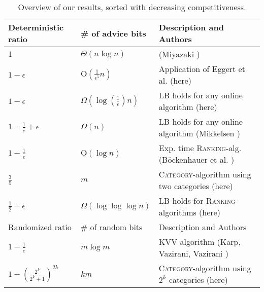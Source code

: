 \documentclass[a4paper]{article}
\newcommand{\Order}{\mathrm{O}}
\begin{document}
\begin{table}[ht]
\small
\begin{center}
 \begin{tabularx}{\textwidth}{|llX|}
\hline
Deterministic ratio & \# of advice bits & Description and Authors    \\
\hline
$1$ & $\Theta(n \log n)$ & (Miyazaki \cite{m14}) \\
$1-\epsilon$ & $\Order(\frac{1}{\epsilon^5} n)$ & Application of Eggert et al. \cite{ekms11} (here) \\
$1-\epsilon$ & $\Omega(\log(\frac{1}{\epsilon})n)$ & LB holds for any online algorithm (here) \\
$1-\frac{1}{e} + \epsilon$ & $\Omega(n)$ & LB holds for any online algorithm (Mikkelsen \cite{m15}) \\
$1-\frac{1}{e}$ &  $\Order(\log n)$ & Exp. time \textsc{Ranking}-alg. (Böckenhauer et al. \cite{bkkk11}) \\
$\frac{3}{5}$ & $m$ & \textsc{Category}-algorithm using two categories (here) \\
$\frac{1}{2}+\epsilon$ & $\Omega(\log \log \log n)$ &  LB holds for \textsc{Ranking}-algorithms (here) \\
\hline
Randomized ratio & \# of random bits & Description and Authors    \\
\hline
$1 - \frac{1}{e}$ & $m \log m$ & \textsc{KVV} algorithm (Karp, Vazirani, Vazirani \cite{kvv90}) \\
$1 - \left( \frac{2^k}{2^k + 1}\right)^{2k}$ & $k m$ &   \textsc{Category}-algorithm using $2^k$ categories (here)\\
\hline
\end{tabularx}
\caption{Overview of our results, sorted with decreasing competitiveness. \label{tab:results}}
\end{center}
\end{table}
\end{document}
